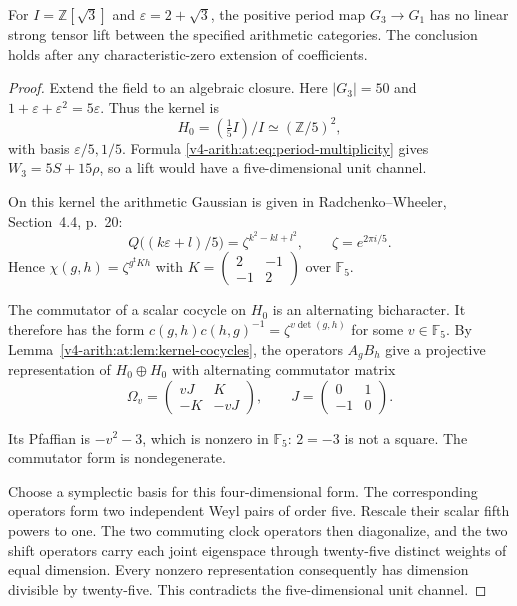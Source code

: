 \begin{proposition}
\label{v4-arith:at:prop:third-period}
For $I=\mathbb Z[\sqrt3]$ and $\varepsilon=2+\sqrt3$, the positive
period map $G_3\to G_1$ has no linear strong tensor lift between the
specified arithmetic categories. The conclusion holds after any
characteristic-zero extension of coefficients.
\end{proposition}
\begin{proof}
Extend the field to an algebraic closure. Here $|G_3|=50$ and
$1+\varepsilon+\varepsilon^2=5\varepsilon$. Thus the kernel is
\[
 H_0=(\tfrac15 I)/I\simeq(\mathbb Z/5)^2,
\]
with basis $\varepsilon/5,1/5$. Formula
\eqref{v4-arith:at:eq:period-multiplicity} gives $W_3=5S+15\rho$, so a
lift would have a five-dimensional unit channel.

On this kernel the arithmetic Gaussian is
given in Radchenko--Wheeler, Section~4.4, p.~20:
\[
 Q\bigl((k\varepsilon+l)/5\bigr)
       =\zeta^{k^2-kl+l^2},\qquad \zeta=e^{2\pi i/5}.
\]
Hence $\chi(g,h)=\zeta^{g^{\mathsf t}Kh}$ with
$K=\left(\begin{smallmatrix}2&-1\\-1&2\end{smallmatrix}\right)$
over $\mathbb F_5$.

The commutator of a scalar cocycle on $H_0$ is
an alternating bicharacter. It therefore has the form
$c(g,h)c(h,g)^{-1}=\zeta^{v\det(g,h)}$ for some $v\in\mathbb F_5$.
By Lemma~\ref{v4-arith:at:lem:kernel-cocycles}, the operators $A_gB_h$
give a projective representation of $H_0\oplus H_0$ with alternating
commutator matrix
\[
 \Omega_v=\begin{pmatrix}vJ&K\\-K&-vJ\end{pmatrix},
 \qquad J=\begin{pmatrix}0&1\\-1&0\end{pmatrix}.
\]

Its Pfaffian is $-v^2-3$, which is nonzero in $\mathbb F_5$:
$2=-3$ is not a square. The commutator form is nondegenerate.

Choose a symplectic basis for this four-dimensional form. The
corresponding operators form two independent Weyl pairs of order
five. Rescale their scalar fifth powers to one. The two commuting
clock operators then diagonalize, and the two shift operators carry
each joint eigenspace through twenty-five distinct weights of equal
dimension. Every nonzero representation consequently has dimension
divisible by twenty-five. This contradicts the five-dimensional
unit channel.
\end{proof}

